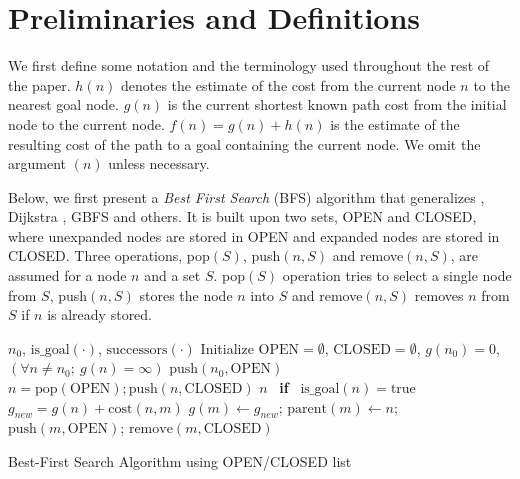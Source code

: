 \section{Preliminaries and Definitions}

\label{sec:preliminaries}

We first define some notation and the terminology used throughout the
rest of the paper.
$h(n)$ denotes the estimate of the cost from the current node $n$ to the nearest goal node.
$g(n)$ is the current shortest known path cost from the initial node to the current node.
$f(n)=g(n)+h(n)$ is the estimate of the resulting cost of the path to a goal
containing the current node.
We omit the argument $(n)$ unless necessary.

Below, we first present a \emph{Best First Search} (BFS) algorithm that generalizes \astar, Dijkstra \cite{dijkstra1959note}, GBFS and others.
It is built upon two sets, OPEN and CLOSED, where unexpanded nodes are stored in OPEN and expanded nodes are stored in CLOSED. Three operations, pop$(S)$, push$(n,S)$ and remove$(n,S)$, are assumed for a node $n$ and a set $S$.
pop$(S)$ operation tries to select a single node from $S$,
push$(n,S)$ stores the node $n$ into $S$ and remove$(n,S)$ removes $n$ from $S$ if $n$ is already stored.

\begin{algorithm}                      
\begin{algorithmic}
 \REQUIRE $n_0$, $\text{is\_goal}(\cdot)$, $\text{successors}(\cdot)$ %
 \STATE Initialize $\text{OPEN}=\emptyset$, $\text{CLOSED}=\emptyset$, $g(n_0)=0$, $\left(\forall n\not=n_0;\ g(n)=\infty\right)$
 \STATE $\text{push}(n_0,\text{OPEN})$
 \STATE $n = \text{pop}(\text{OPEN}); \text{push}(n,\text{CLOSED})$
 \RETURN $n$ \  \textbf{if} \  $\text{is\_goal}(n)=\text{true}$
 \STATE $g_{new} = g(n) + \text{cost}(n,m)$
 \STATE $g(m) \leftarrow g_{new}$;\; $\text{parent}(m) \leftarrow n$;\; $\text{push}(m,\text{OPEN})$;\; $\text{remove}(m,\text{CLOSED})$
 \ENDIF
 \ENDFOR
 \ENDWHILE
\end{algorithmic}
\caption{Best-First Search Algorithm using OPEN/CLOSED list}
\label{alg:ocl}
\end{algorithm}

